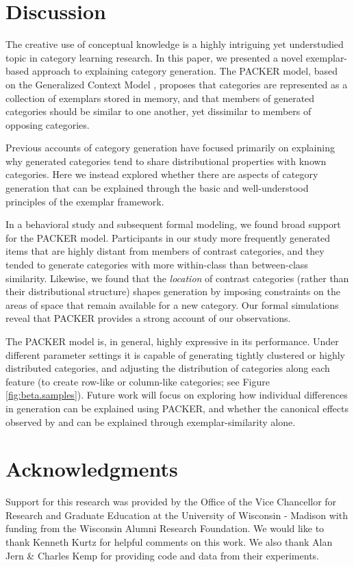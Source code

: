 \documentclass[10pt,letterpaper]{article}
\begin{document}
\section{Discussion}

The creative use of conceptual knowledge is a highly intriguing yet understudied topic in category learning research. In this paper, we presented a novel exemplar-based approach to explaining category generation. The PACKER model, based on the Generalized Context Model \citep[GCM;][]{nosofsky1984choice}, proposes that categories are represented as a collection of exemplars stored in memory, and that members of generated categories should be similar to one another, yet dissimilar to members of opposing categories.

Previous accounts of category generation \citep[see][]{jern2013probabilistic,ward1995s,ward1994structured} have focused primarily on explaining why generated categories tend to share distributional properties with known categories. Here we instead explored whether there are aspects of category generation that can be explained through the basic and well-understood principles of the exemplar framework.

In a behavioral study and subsequent formal modeling, we found broad support for the PACKER model. Participants in our study more frequently generated items that are highly distant from members of contrast categories, and they tended to generate categories with more within-class than between-class similarity. Likewise, we found that the \textit{location} of contrast categories (rather than their distributional structure) shapes generation by imposing constraints on the areas of space that remain available for a new category. Our formal simulations reveal that PACKER provides a strong account of our observations.

The PACKER model is, in general, highly expressive in its performance. Under different parameter settings it is capable of generating tightly clustered or highly distributed categories, and adjusting the distribution of categories along each feature (to create row-like or column-like categories; see Figure \ref{fig:beta.samples}). Future work will focus on exploring how individual differences in generation can be explained using PACKER, and whether the canonical effects observed by \citet{ward1994structured} and \citet{jern2013probabilistic} can be explained through exemplar-similarity alone.

\section{Acknowledgments}
Support for this research was provided by the Office of the Vice Chancellor for Research and Graduate Education at the University of Wisconsin - Madison with funding from the Wisconsin Alumni Research Foundation. We would like to thank Kenneth Kurtz for helpful comments on this work. We also thank Alan Jern \& Charles Kemp for providing code and data from their experiments.




\setlength{\bibleftmargin}{.025in}
\setlength{\bibindent}{-\bibleftmargin}

\end{document}
